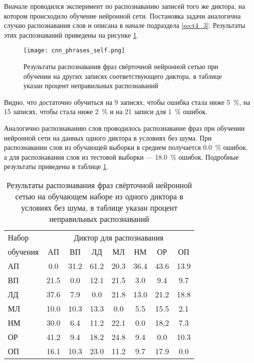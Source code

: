 Вначале проводился эксперимент по распознаванию записей того же диктора, на котором происходило обучение нейронной сети.
Постановка задачи аналогична случаю распознавания слов и описана в начале подраздела \ref{sect4_3}.
Результаты этих распознаваний приведены на рисунке \ref{fig:cnn_phrases_self}.

\begin{figure}[h]
	\centering
	\texttt{[image: cnn\_phrases\_self.png]}
	\caption{Результаты распознавания фраз свёрточной нейронной сетью при обучении на других записях соответствующего диктора, в таблице указан процент неправильных распознаваний}
	\label{fig:cnn_phrases_self}
\end{figure}

Видно, что достаточно обучиться на 9 записях, чтобы ошибка стала ниже 5~\%, на 15 записях, чтобы стала ниже 2~\% и на 21 записи для 1~\% ошибок.

Аналогично распознаванию слов проводилось распознавание фраз при обучении нейронной сети на данных одного диктора в условиях без шума.
При распознавании слов из обучающей выборки в среднем получается 0.0~\% ошибок, а для распознавания слов из тестовой выборки --- 18.0~\% ошибок.
Подробные результаты приведены в таблице \ref{tab:cnn_phrases_1dictor}.

\begin{table}[h]
	\centering
	\caption{Результаты распознавания фраз свёрточной нейронной сетью на обучающем наборе из одного диктора в условиях без шума, в таблице указан процент неправильных распознаваний}
	\label{tab:cnn_phrases_1dictor}
	\begin{tabular}{| l | c | c | c | c | c | c | c |}
		\hline
		Набор & \multicolumn{7}{c|}{Диктор для распознавания} \\
		\hhline{~-------}
		обучения \phantom{0000} & \phantom{0} АП \phantom{0} & \phantom{0} ВП \phantom{0} & \phantom{0} ЛД \phantom{0} & \phantom{0} МЛ \phantom{0} & \phantom{0} НМ \phantom{0} & \phantom{0} ОР \phantom{0} & \phantom{0} ОП \phantom{0} \\
		\hline
		АП 		 &  0.0 & 31.2 & 61.2 & 20.3 & 36.4 & 43.6 & 13.9 \\
		ВП 		 & 21.5 &  0.0 & 12.1 & 21.5 &  3.0 &  9.4 &  9.7 \\
		ЛД 		 & 37.6 &  7.9 &  0.0 & 21.8 & 13.0 & 21.2 & 18.8 \\
		МЛ 		 & 10.0 & 10.3 & 13.3 &  0.0 &  5.5 & 15.5 &  2.1 \\
		НМ 		 & 30.0 &  6.4 & 11.2 & 22.1 &  0.0 & 18.2 &  7.3 \\
		ОР 		 & 41.2 &  9.4 & 18.2 & 24.8 &  9.4 &  0.0 & 10.3 \\
		ОП 		 & 16.1 & 10.3 & 23.0 & 11.2 &  9.7 & 17.9 &  0.0 \\
		\hline
	\end{tabular}
\end{table}

